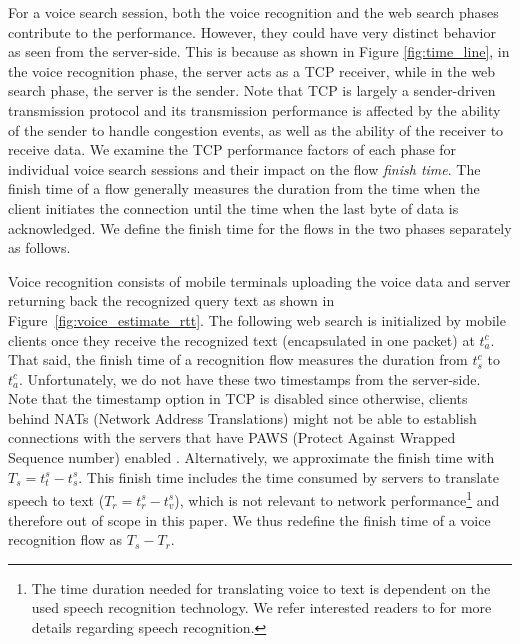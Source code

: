 For a voice search session, both the voice recognition and the web search phases contribute to the performance. However, they could have very distinct behavior as seen from the server-side. This is because as shown in Figure \ref{fig:time_line}, in the voice recognition phase, the server acts as a TCP receiver, while in the web search phase, the server is the sender. Note that TCP is largely a sender-driven transmission protocol and its transmission performance is affected by the ability of the sender to handle congestion events, as well as the ability of the receiver to receive data. We examine the TCP performance factors of each phase for individual voice search sessions and their impact on the flow \emph{finish time}. The finish time of a flow generally measures the duration from the time when the client initiates the connection until the time when the last byte of data is acknowledged. We define the finish time for the flows in the two phases separately as follows.

Voice recognition consists of mobile terminals uploading the voice data and server returning back the recognized query text as shown in Figure~\ref{fig:voice_estimate_rtt}. The following web search is initialized by mobile clients once they receive the recognized text (encapsulated in one packet) at $t^c_a$. That said, the finish time of a recognition flow measures the duration from $t^c_s$ to $t^c_a$. Unfortunately, we do not have these two timestamps from the server-side. Note that the timestamp option in TCP is disabled since otherwise, clients behind NATs (Network Address Translations) might not be able to establish connections with the servers that have PAWS (Protect Against Wrapped Sequence number) \cite{rfc7323} enabled \cite{Wang:2011:USM:2018436.2018479}. Alternatively, we approximate the finish time with $T_s=t^s_t - t^s_s$. This finish time includes the time consumed by servers to translate speech to text ($T_r=t^s_r - t^s_v$), which is not relevant to network performance\footnote{The time duration needed for translating voice to text is dependent on the used speech recognition technology. We refer interested readers to \cite{36463,schalkwyk2010your} for more details regarding speech recognition.} and therefore out of scope in this paper. We thus redefine the finish time of a voice recognition flow as $T_s-T_r$.

